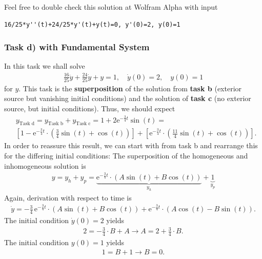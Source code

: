 Feel free to double check this solution at Wolfram Alpha with input
\begin{verbatim}
16/25*y''(t)+24/25*y'(t)+y(t)=0, y'(0)=2, y(0)=1
\end{verbatim}



\subsubsection{Task d) with Fundamental System}
In this task we shall solve
\begin{align}
\frac{16}{25} \ddot{y} + \frac{24}{25} \dot{y} + y = 1, \quad
\dot{y}(0) = 2,\quad y(0)=1
\end{align}
for $y$.
%
This task is the \textbf{superposition} of the solution from \textbf{task b} (exterior source
but vanishing initial conditions) and the solution of \textbf{task c} (no exterior
source, but initial conditions). Thus, we should expect
\begin{align}
&y_\text{Task d} =
y_\text{Task b} +
y_\text{Task c} = 1 + 2\mathrm{e}^{-\frac{3}{4} t} \sin(t) = \nonumber\\
&\left[1 - \mathrm{e}^{-\frac{3}{4} t} \cdot
\left( \frac{3}{4} \sin(t) + \cos(t)\right)\right]
+\left[\mathrm{e}^{-\frac{3}{4} t} \cdot
\left( \frac{11}{4} \sin(t) + \cos(t)\right)\right].
\end{align}
%
In order to reassure this result, we can start with  from
task b and rearrange this for the differing initial conditions:
The superposition of the homogeneous and inhomogeneous solution is
\begin{align}
y = y_h + y_p = \underbrace{
\mathrm{e}^{-\frac{3}{4} t} \cdot
\left( A \sin(t) + B \cos(t)\right)}_{y_h} + \underbrace{1}_{y_p}
\end{align}
Again, derivation with respect to time is
\begin{align}
\dot{y}
=
-\frac{3}{4}\,\mathrm{e}^{-\frac{3}{4} t} \cdot
\left( A \sin(t) + B \cos(t)\right)
+
\mathrm{e}^{-\frac{3}{4} t} \cdot
\left( A \cos(t)  - B \sin(t)\right).
\end{align}
The initial condition $\dot{y}(0) = 2$ yields
\begin{align}
2 = -\frac{3}{4}\cdot B + A \rightarrow A = 2 +  \frac{3}{4}\cdot B.
\end{align}
The initial condition ${y}(0) = 1$ yields
\begin{align}
1 = B  + 1 \rightarrow B = 0.
\end{align}

